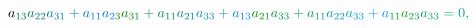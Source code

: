 \documentclass[12pt]{article}
\begin{document}
\begin{displaymath}
{a} _ { \mathcolor[RGB]{0,120,60}{1} \mathcolor[RGB]{0,120,75}{3} } \mathcolor[RGB]{0,120,90}{a} _ { \mathcolor[RGB]{0,120,105}{2} \mathcolor[RGB]{0,120,120}{2} } \mathcolor[RGB]{0,120,135}{a} _ { \mathcolor[RGB]{0,120,150}{3} \mathcolor[RGB]{0,120,165}{1} } \mathcolor[RGB]{0,120,180}{+} \mathcolor[RGB]{0,120,195}{a} _ { \mathcolor[RGB]{0,120,210}{1} \mathcolor[RGB]{0,120,225}{1} } \mathcolor[RGB]{0,120,240}{a} _ { \mathcolor[RGB]{0,120,255}{2} \mathcolor[RGB]{0,135,0}{3} } \mathcolor[RGB]{0,135,15}{a} _ { \mathcolor[RGB]{0,135,30}{3} \mathcolor[RGB]{0,135,45}{1} } \mathcolor[RGB]{0,135,60}{+} \mathcolor[RGB]{0,135,75}{a} _ { \mathcolor[RGB]{0,135,90}{1} \mathcolor[RGB]{0,135,105}{1} } \mathcolor[RGB]{0,135,120}{a} _ { \mathcolor[RGB]{0,135,135}{2} \mathcolor[RGB]{0,135,150}{1} } \mathcolor[RGB]{0,135,165}{a} _ { \mathcolor[RGB]{0,135,180}{3} \mathcolor[RGB]{0,135,195}{3} } \mathcolor[RGB]{0,135,210}{+} \mathcolor[RGB]{0,135,225}{a} _ { \mathcolor[RGB]{0,135,240}{1} \mathcolor[RGB]{0,135,255}{3} } \mathcolor[RGB]{0,150,0}{a} _ { \mathcolor[RGB]{0,150,15}{2} \mathcolor[RGB]{0,150,30}{1} } \mathcolor[RGB]{0,150,45}{a} _ { \mathcolor[RGB]{0,150,60}{3} \mathcolor[RGB]{0,150,75}{3} } \mathcolor[RGB]{0,150,90}{+} \mathcolor[RGB]{0,150,105}{a} _ { \mathcolor[RGB]{0,150,120}{1} \mathcolor[RGB]{0,150,135}{1} } \mathcolor[RGB]{0,150,150}{a} _ { \mathcolor[RGB]{0,150,165}{2} \mathcolor[RGB]{0,150,180}{2} } \mathcolor[RGB]{0,150,195}{a} _ { \mathcolor[RGB]{0,150,210}{3} \mathcolor[RGB]{0,150,225}{3} } \mathcolor[RGB]{0,150,240}{+} \mathcolor[RGB]{0,150,255}{a} _ { \mathcolor[RGB]{0,165,0}{1} \mathcolor[RGB]{0,165,15}{1} } \mathcolor[RGB]{0,165,30}{a} _ { \mathcolor[RGB]{0,165,45}{2} \mathcolor[RGB]{0,165,60}{3} } \mathcolor[RGB]{0,165,75}{a} _ { \mathcolor[RGB]{0,165,90}{3} \mathcolor[RGB]{0,165,105}{3} } \mathcolor[RGB]{0,165,120}{=} \mathcolor[RGB]{0,165,135}{0} \mathcolor[RGB]{0,165,150}{,} \mathcolor[RGB]{0,165,165}{\,
}
\end{displaymath}
\end{document}
